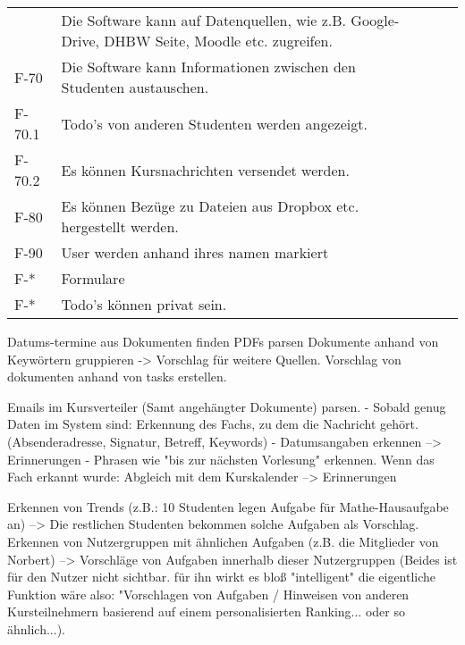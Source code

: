 \begin{table}[H]
\begin{tabularx}{\textwidth}{|l|X|l|l|}
{        F-60 & Die Software kann auf Datenquellen, wie z.B. Google-Drive, DHBW Seite, Moodle etc. zugreifen. & & \\

        F-70 & Die Software kann Informationen zwischen den Studenten austauschen. & & \\
        F-70.1 & Todo's von anderen Studenten werden angezeigt. & &\\
        F-70.2 & Es können Kursnachrichten versendet werden. & &\\
        F-80 & Es können Bezüge zu Dateien aus Dropbox etc. hergestellt werden. & &\\
        F-90 & User werden anhand ihres namen markiert & &\\ %

        F-* & Formulare & &\\

        F-* & Todo's können privat sein. & & \\

        




        \hline
    \end{tabularx}

\end{table}

Datums-termine aus Dokumenten finden %
PDFs parsen %
Dokumente anhand von Keywörtern gruppieren -> Vorschlag für weitere Quellen. %
Vorschlag von dokumenten anhand von tasks erstellen. %

Emails im Kursverteiler (Samt angehängter Dokumente) parsen. %
    - Sobald genug Daten im System sind: Erkennung des Fachs, zu dem die Nachricht gehört. (Absenderadresse, Signatur, Betreff, Keywords) %
    - Datumsangaben erkennen --> Erinnerungen %
    - Phrasen wie "bis zur nächsten Vorlesung" erkennen. Wenn das Fach erkannt wurde: Abgleich mit dem Kurskalender --> Erinnerungen %

Erkennen von Trends (z.B.: 10 Studenten legen Aufgabe für Mathe-Hausaufgabe an)
    --> Die restlichen Studenten bekommen solche Aufgaben als Vorschlag. %
Erkennen von Nutzergruppen mit ähnlichen Aufgaben (z.B. die Mitglieder von Norbert)
    --> Vorschläge von Aufgaben innerhalb dieser Nutzergruppen %
(Beides ist für den Nutzer nicht sichtbar. für ihn wirkt es bloß "intelligent" die eigentliche 
Funktion wäre also: "Vorschlagen von Aufgaben / Hinweisen von anderen Kursteilnehmern basierend
auf einem personalisierten Ranking... oder so ähnlich...).

